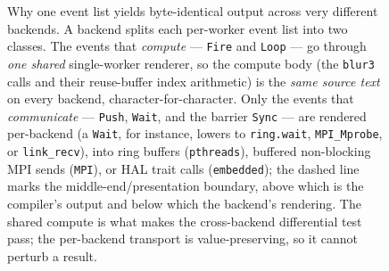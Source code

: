 \begin{figure}[tbp]
  \caption[One event list, three renderings]{Why one event list yields
    byte-identical output across very different backends. A backend splits each
    per-worker event list into two classes. The events that \emph{compute} ---
    \texttt{Fire} and \texttt{Loop} --- go through \emph{one shared} single-worker
    renderer, so the compute body (the \texttt{blur3} calls and their
    reuse-buffer index arithmetic) is the \emph{same source text} on every
    backend, character-for-character. Only the events that \emph{communicate} ---
    \texttt{Push}, \texttt{Wait}, and the barrier \texttt{Sync} --- are rendered
    per-backend (a \texttt{Wait}, for instance, lowers to \texttt{ring.wait},
    \texttt{MPI\_Mprobe}, or \texttt{link\_recv}), into ring buffers
    (\texttt{pthreads}), buffered non-blocking MPI sends (\texttt{MPI}), or HAL
    trait calls (\texttt{embedded}); the dashed line marks the
    middle-end/presentation boundary, above which is the compiler's output and
    below which the backend's rendering. The shared
    compute is what makes the cross-backend differential test pass; the
    per-backend transport is value-preserving, so it cannot perturb a result.}
  \label{fig:wt-lowering}
\end{figure}

